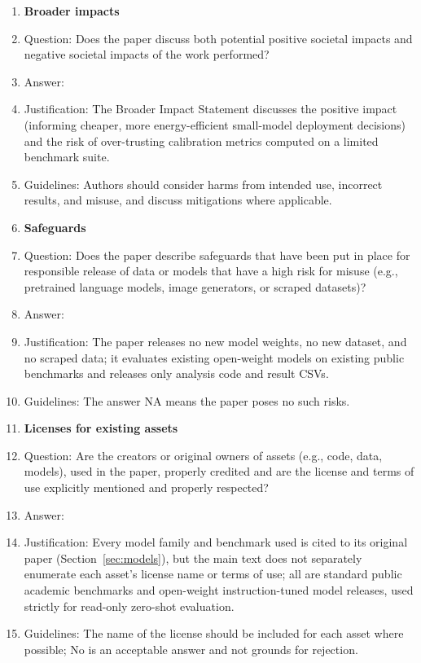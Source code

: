 \documentclass{article}
\begin{document}
\begin{enumerate}
\item {\bf Broader impacts}
    \item[] Question: Does the paper discuss both potential positive societal impacts and negative societal impacts of the work performed?
    \item[] Answer: \answerYes{}
    \item[] Justification: The Broader Impact Statement discusses the positive impact (informing cheaper, more energy-efficient small-model deployment decisions) and the risk of over-trusting calibration metrics computed on a limited benchmark suite.
    \item[] Guidelines: Authors should consider harms from intended use, incorrect results, and misuse, and discuss mitigations where applicable.

\item {\bf Safeguards}
    \item[] Question: Does the paper describe safeguards that have been put in place for responsible release of data or models that have a high risk for misuse (e.g., pretrained language models, image generators, or scraped datasets)?
    \item[] Answer: \answerNA{}
    \item[] Justification: The paper releases no new model weights, no new dataset, and no scraped data; it evaluates existing open-weight models on existing public benchmarks and releases only analysis code and result CSVs.
    \item[] Guidelines: The answer NA means the paper poses no such risks.

\item {\bf Licenses for existing assets}
    \item[] Question: Are the creators or original owners of assets (e.g., code, data, models), used in the paper, properly credited and are the license and terms of use explicitly mentioned and properly respected?
    \item[] Answer: \answerNo{}
    \item[] Justification: Every model family and benchmark used is cited to its original paper (Section~\ref{sec:models}), but the main text does not separately enumerate each asset's license name or terms of use; all are standard public academic benchmarks and open-weight instruction-tuned model releases, used strictly for read-only zero-shot evaluation.
    \item[] Guidelines: The name of the license should be included for each asset where possible; No is an acceptable answer and not grounds for rejection.


\end{enumerate}
\end{document}
